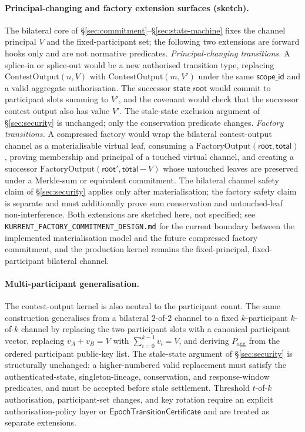 \documentclass[10pt,a4paper]{article}
\begin{document}
\paragraph{Principal-changing and factory extension surfaces (\textbf{sketch}).} The bilateral core of §\ref{sec:commitment}--§\ref{sec:state-machine} fixes the channel principal $V$ and the fixed-participant set; the following two extensions are forward hooks only and are not normative predicates. \emph{Principal-changing transitions.} A splice-in or splice-out would be a new authorised transition type, replacing $\mathrm{ContestOutput}(n, V)$ with $\mathrm{ContestOutput}(m, V')$ under the same $\mathsf{scope\_id}$ and a valid aggregate authorisation. The successor $\mathsf{state\_root}$ would commit to participant slots summing to $V'$, and the covenant would check that the successor contest output also has value $V'$. The stale-state exclusion argument of §\ref{sec:security} is unchanged; only the conservation predicate changes. \emph{Factory transitions.} A compressed factory would wrap the bilateral contest-output channel as a materialisable virtual leaf, consuming a $\mathrm{FactoryOutput}(\mathsf{root}, \mathsf{total})$, proving membership and principal of a touched virtual channel, and creating a successor $\mathrm{FactoryOutput}(\mathsf{root}', \mathsf{total} - V)$ whose untouched leaves are preserved under a Merkle-sum or equivalent commitment. The bilateral channel safety claim of §\ref{sec:security} applies only after materialisation; the factory safety claim is separate and must additionally prove sum conservation and untouched-leaf non-interference. Both extensions are sketched here, not specified; see \texttt{KURRENT\_FACTORY\_COMMITMENT\_DESIGN.md} for the current boundary between the implemented materialisation model and the future compressed factory commitment, and the production kernel remains the fixed-principal, fixed-participant bilateral channel.

\paragraph{Multi-participant generalisation.} The contest-output kernel is also neutral to the participant count. The same construction generalises from a bilateral $2$-of-$2$ channel to a fixed $k$-participant $k$-of-$k$ channel by replacing the two participant slots with a canonical participant vector, replacing $v_A + v_B = V$ with $\sum_{i=0}^{k-1} v_i = V$, and deriving $P_{\mathrm{agg}}$ from the ordered participant public-key list. The stale-state argument of §\ref{sec:security} is structurally unchanged: a higher-numbered valid replacement must satisfy the authenticated-state, singleton-lineage, conservation, and response-window predicates, and must be accepted before stale settlement. Threshold $t$-of-$k$ authorisation, participant-set changes, and key rotation require an explicit authorisation-policy layer or $\mathsf{EpochTransitionCertificate}$ and are treated as separate extensions.
\end{document}
